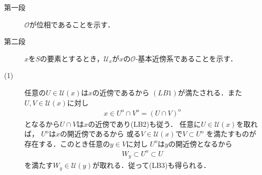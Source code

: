 	\begin{prf}\mbox{}
		\begin{description}
			\item[第一段]
				$\mathscr{O}$が位相であることを示す．
				
			\item[第二段]
				$x$を$S$の要素とするとき，$\mathscr{U}_x$が$x$の$\mathscr{O}$-基本近傍系であることを示す．
				
		\end{description}
		\begin{description}
			\item[(1)] 任意の$U \in \mathscr{U}(x)$は$x$の近傍であるから
				$(LB1)$が満たされる．また$U,V \in \mathscr{U}(x)$に対し
				\begin{align}
					x \in U^{\mathrm{o}} \cap V^{\mathrm{o}} = (U \cap V)^{\mathrm{o}}
				\end{align}
				となるから$U \cap V$は$x$の近傍であり(LB2)も従う．
				任意に$U \in \mathscr{U}(x)$を取れば，
				$U^{\mathrm{o}}$は$x$の開近傍であるから
				或る$V \in \mathscr{U}(x)$で$V \subset U^{\mathrm{o}}$
				を満たすものが存在する．このとき任意の$y \in V$に対し
				$U^{\mathrm{o}}$は$y$の開近傍となるから
				\begin{align}
					W_y \subset U^{\mathrm{o}} \subset U
				\end{align}
				を満たす$W_y \in \mathscr{U}(y)$が取れる．従って(LB3)も得られる．
			

\end{description}
\end{prf}

